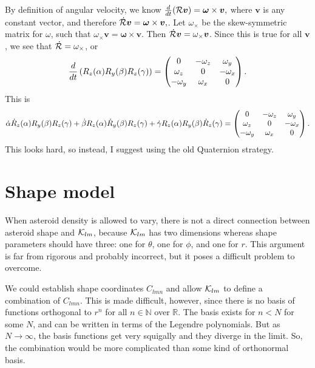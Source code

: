 \documentclass[aps,twocolumn,secnumarabic,balancelastpage,amsmath,amssymb,nofootinbib,floatfix]{revtex4-1}
\begin{document}
By definition of angular velocity, we know $\frac{d}{dt}(\mathcal{R} \bm v) = \bm \omega \times \bm v,$ where $\bm v$ is any constant vector, and therefore $\dot {\mathcal{R}} \bm v = \bm \omega \times \bm v,$. Let $\omega_{\times}$ be the skew-symmetric matrix for $\omega$, such that $\omega_{\times} \bm v = \bm\omega \times \bm v$. Then $\dot {\mathcal{R}} \bm v = \omega_\times \bm v$. Since this is true for all $\bm v$, we see that $\dot {\mathcal{R}} = \omega_\times$, or
$$\frac{d}{dt}\left( R_z(\alpha)R_y(\beta)R_z(\gamma) \right) = \left( \begin{matrix}
0 & -\omega_z & \omega_y \\
\omega_z & 0 & -\omega_x \\
-\omega_y & \omega_x & 0
 \end{matrix} \right).$$
 This is
 $$\dot \alpha \dot R_z(\alpha)R_y(\beta)R_z(\gamma) + \dot \beta R_z(\alpha)\dot R_y(\beta)R_z(\gamma) + \dot \gamma R_z(\alpha)R_y(\beta)\dot R_z(\gamma) = \left( \begin{matrix}
 0 & -\omega_z & \omega_y \\
 \omega_z & 0 & -\omega_x \\
 -\omega_y & \omega_x & 0
  \end{matrix} \right).$$
  This looks hard, so instead, I suggest using the old Quaternion strategy.



\section{Shape model}
When asteroid density is allowed to vary, there is not a direct connection between asteroid shape and $\mathcal{K}_{lm}$, because $\mathcal{K}_{lm}$ has two dimensions whereas shape parameters should have three: one for $\theta$, one for $\phi$, and one for $r$. This argument is far from rigorous and probably incorrect, but it poses a difficult problem to overcome.

We could establish shape coordinates $C_{lmn}$ and allow $\mathcal{K}_{lm}$ to define a combination of $C_{lmn}$. This is made difficult, however, since there is no basis of functions orthogonal to $r^n$ for all $n \in \mathbb{N}$ over $\mathbb{R}$. The basis exists for $n < N$ for some $N$, and can be written in terms of the Legendre polynomials. But as $N\rightarrow\infty$, the basis functions get very squigally and they diverge in the limit. So, the combination would be more complicated than some kind of orthonormal basis.
\end{document}
